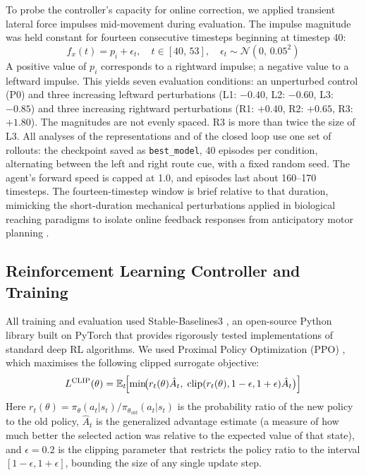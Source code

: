 \documentclass{article}
\begin{document}
To probe the controller's capacity for online correction, we applied
transient lateral force impulses mid-movement during evaluation.
The impulse magnitude was held constant for fourteen consecutive timesteps
beginning at timestep 40:
\begin{equation}
  f_x(t) = p_i + \epsilon_t, \quad t \in [40,\,53], \quad
  \epsilon_t \sim \mathcal{N}(0,\,0.05^2)
  \label{eq:perturbation}
\end{equation}
A positive value of $p_i$ corresponds to a rightward impulse; a negative
value to a leftward impulse.
This yields seven evaluation conditions: an unperturbed control (P0) and
three increasing leftward perturbations (L1: $-0.40$, L2: $-0.60$, L3:
$-0.85$) and three increasing rightward perturbations (R1: $+0.40$, R2:
$+0.65$, R3: $+1.80$).
The magnitudes are not evenly spaced.
R3 is more than twice the size of L3.
All analyses of the representations and of the closed loop use one set of
rollouts: the checkpoint saved as \texttt{best\_model}, 40 episodes per
condition, alternating between the left and right route cue, with a
fixed random seed.
The agent's forward speed is capped at 1.0, and episodes last about
160--170 timesteps.
The fourteen-timestep window is brief relative to that duration, mimicking the short-duration
mechanical perturbations applied in biological reaching paradigms to
isolate online feedback responses from anticipatory motor planning
\citep{Pruszynski2012,Nashed2014,Dimitriou2013,Todorov2002,Shadmehr1994}.

\subsection{Reinforcement Learning Controller and Training}

All training and evaluation used Stable-Baselines3
\citep{Raffin2021StableBaselines3}, an open-source Python library built
on PyTorch that provides rigorously tested implementations of standard
deep RL algorithms.
We used Proximal Policy Optimization (PPO) \citep{Schulman2017}, which
maximises the following clipped surrogate objective:
\begin{equation}
  L^{\mathrm{CLIP}}(\theta) = \mathbb{E}_t\!\Bigl[
    \min\!\bigl(r_t(\theta)\hat{A}_t,\;
    \mathrm{clip}(r_t(\theta),1-\epsilon,1+\epsilon)\hat{A}_t\bigr)
  \Bigr]
  \label{eq:ppo}
\end{equation}
Here $r_t(\theta) = \pi_\theta(a_t|s_t) / \pi_{\theta_{\mathrm{old}}}(a_t|s_t)$
is the probability ratio of the new policy to the old policy,
$\hat{A}_t$ is the generalized advantage estimate (a measure of how much
better the selected action was relative to the expected value of that
state), and $\epsilon = 0.2$ is the clipping parameter that restricts
the policy ratio to the interval $[1-\epsilon, 1+\epsilon]$, bounding
the size of any single update step.
\end{document}
